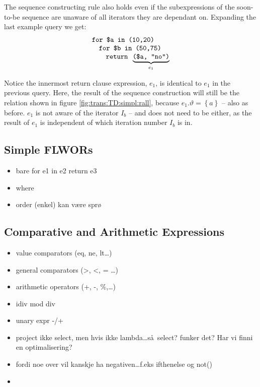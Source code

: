 \begin{myExample}
The sequence constructing rule also holds even if the subexpressions of the soon-to-be sequence are unaware of all
iterators they are dependant on. Expanding the last example query we get:
\begin{equation*}
\begin{array}{l}
\mbox{\texttt{for \$a in (10,20)}} \\ \quad
\mbox{\texttt{for \$b in (50,75)}} \\ \quad \quad
\mbox{\texttt{return }} \underbrace{ \mbox{\texttt{(\$a, "no")}} }_{e_{1}}
\end{array}
\end{equation*}

Notice the innermost return clause expression, $e_{1}$, is identical to $e_{1}$ in the previous query. Here, the
result of the sequence construction will still be the relation shown in figure \ref{fig:trans:TD:simpl:rall},
because $e_{1}.\vartheta=\left\{a\right\}$ -- also as before. $e_{1}$ is not aware of the iterator $I_{b}$ -- and
does not need to be either, as the result of $e_{1}$ is independent of which iteration number $I_{b}$ is in.

\end{myExample}


\subsection{Simple FLWORs}
\label{sect:trans:TD:simpleFLWOR}
\begin{itemize}
  \item bare for e1 in e2 return e3
  \item where
  \item order (enkel) kan v\ae re spr\o
\end{itemize}

\subsection{Comparative and Arithmetic Expressions}
\label{sect:trans:TD:compArit}
\begin{itemize}
  \item value comparators (eq, ne, lt\ldots)
  \item general comparators (>, <, = \ldots)
  \item arithmetic operators (+, -, \%,\ldots)
  \item idiv mod div
  \item unary expr -/+
  \item project ikke select, men hvis ikke lambda\ldots s\aa~select? funker det? Har vi finni en optimalisering?
  \item fordi noe over vil kanskje ha negativen\ldots f.eks ifthenelse og not()  \item 
\end{itemize}

